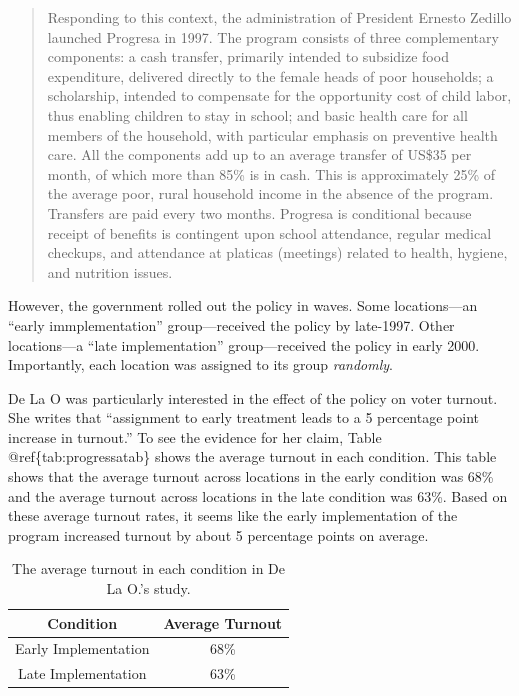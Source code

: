 \documentclass[]{book}
\theoremstyle{definition}
\theoremstyle{definition}
\theoremstyle{definition}
\theoremstyle{remark}
\begin{document}
\begin{enumerate}
  \begin{quote}
  Responding to this context, the administration of President Ernesto
  Zedillo launched Progresa in 1997. The program consists of three
  complementary components: a cash transfer, primarily intended to
  subsidize food expenditure, delivered directly to the female heads of
  poor households; a scholarship, intended to compensate for the
  opportunity cost of child labor, thus enabling children to stay in
  school; and basic health care for all members of the household, with
  particular emphasis on preventive health care. All the components add
  up to an average transfer of US\$35 per month, of which more than 85\%
  is in cash. This is approximately 25\% of the average poor, rural
  household income in the absence of the program. Transfers are paid
  every two months. Progresa is conditional because receipt of benefits
  is contingent upon school attendance, regular medical checkups, and
  attendance at platicas (meetings) related to health, hygiene, and
  nutrition issues.
  \end{quote}

  However, the government rolled out the policy in waves. Some
  locations---an ``early immplementation'' group---received the policy
  by late-1997. Other locations---a ``late implementation''
  group---received the policy in early 2000. Importantly, each location
  was assigned to its group \emph{randomly}.

  De La O was particularly interested in the effect of the policy on
  voter turnout. She writes that ``assignment to early treatment leads
  to a 5 percentage point increase in turnout.'' To see the evidence for
  her claim, Table @ref\{tab:progressatab\} shows the average turnout in
  each condition. This table shows that the average turnout across
  locations in the early condition was 68\% and the average turnout
  across locations in the late condition was 63\%. Based on these
  average turnout rates, it seems like the early implementation of the
  program increased turnout by about 5 percentage points on average.

  \begin{table}[!h]

  \caption{\label{tab:progressatab}The average turnout in each condition in De La O.'s study.}
  \centering
  \begin{tabular}[t]{cc}
  \toprule
  Condition & Average Turnout\\
  \midrule
  Early Implementation & 68\%\\
  Late Implementation & 63\%\\
  \bottomrule
  \end{tabular}
  \end{table}


\end{enumerate}
\end{document}

